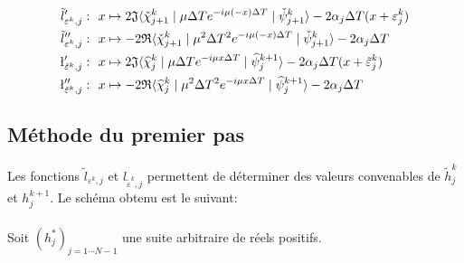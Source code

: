 \begin{align*}
	\tilde{l}'_{\varepsilon^k,j} :& \ \ x \mapsto 2 \mathfrak{J} \langle \check{\chi}_{j+1}^k \mid \mu \Delta T e^{-i \mu (-x)\Delta T} \mid \check{\psi}_{j+1}^k \rangle - 2 \alpha_j\Delta T (x + \varepsilon_j^k)\\
	\tilde{l}''_{\varepsilon^k,j} :& \ \ x \mapsto -2 \mathfrak{R} \langle \check{\chi}_{j+1}^k \mid \mu^2 \Delta T^2 e^{-i \mu (-x)\Delta T} \mid \check{\psi}_{j+1}^k \rangle - 2 \alpha_j\Delta T\\
	\l'_{\tilde{\varepsilon}^k,j} :& \ \ x \mapsto 2 \mathfrak{J} \langle \widehat{\chi}_{j}^k \mid \mu \Delta T e^{-i \mu x\Delta T} \mid \widehat{\psi}_{j}^{k+1} \rangle - 2 \alpha_j\Delta T (x + \tilde{\varepsilon}_j^k)\\
	\l''_{\tilde{\varepsilon}^k,j} :& \ \ x \mapsto -2 \mathfrak{R} \langle \widehat{\chi}_{j}^k \mid \mu^2 \Delta T^2 e^{-i \mu x\Delta T} \mid \widehat{\psi}_{j}^{k+1} \rangle - 2 \alpha_j\Delta T\\	
\end{align*}

\subsection{Méthode du premier pas}

Les fonctions $\tilde{l}_{\varepsilon^k,j}$ et $l_{\tilde{\varepsilon}^k,j}$ permettent de déterminer des valeurs convenables de $\tilde{h}_j^k$ et $h_j^{k+1}$. Le schéma obtenu est le suivant:
\\
\\

Soit $(h_j^*)_{j = 1\cdots N-1}$ une suite arbitraire de réels positifs.

